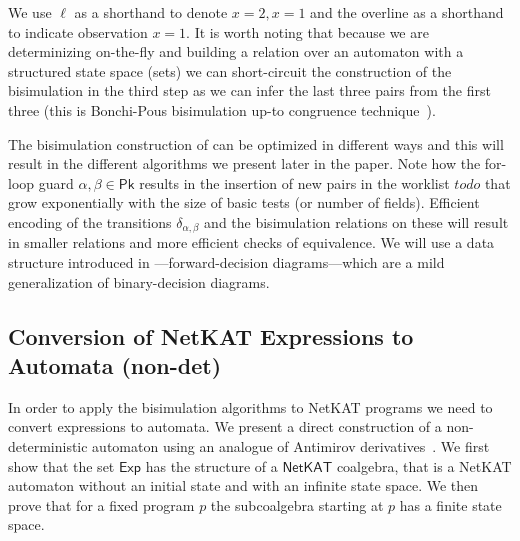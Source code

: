 \documentclass[acmsmall,dvipsnames,nonacm]{acmart}
\newcommand\todoR{\textit{todo}}
\newcommand\Pk{\mathsf{Pk}}
\newcommand\pk{\alpha}
\newcommand\pkp{\beta}
\newcommand\Exp{\mathsf{Exp}}
\newcommand\NetKAT{\textsf{NetKAT}\xspace}
\begin{document}
\begin{example}

We use $\ell$ as a shorthand to denote $x=2,x=1$ and the overline as a shorthand
to indicate observation $x=1$. It is worth noting that because we are
determinizing on-the-fly and building a relation over an automaton with a
structured state space (sets) we can short-circuit the construction of the
bisimulation in the third step as we can infer the last three pairs from the
first three (this is Bonchi-Pous bisimulation up-to congruence
technique~\cite{bonchi-pous2013}).
\end{example}
The bisimulation construction of  can be optimized in different ways and this will result in the different algorithms we present later in the paper. Note how the for-loop guard ${\pk,\pkp \in \Pk}$ results in the insertion of new pairs in the worklist $\todoR$ that grow exponentially with the size of basic tests (or number of fields). Efficient encoding of the transitions $\delta_{\pk,\pkp}$ and the bisimulation relations on these will result in smaller relations and more efficient checks of equivalence. We will use a data structure introduced in \cite{fastcompiler}---forward-decision diagrams---which are a mild generalization of binary-decision diagrams. 


\subsection{Conversion of \NetKAT Expressions to Automata (non-det)} 
In order to apply the bisimulation algorithms to \NetKAT programs we need to convert expressions to automata. We present a direct construction of a non-deterministic automaton using an analogue of Antimirov derivatives~\cite{antimirov}. We first show that the set $\Exp$ has the structure of a $\NetKAT$ coalgebra, that is a \NetKAT automaton without an initial state and with an infinite state space. We then prove that for a fixed program $p$ the subcoalgebra starting at $p$ has a finite state space. 
\end{document}
